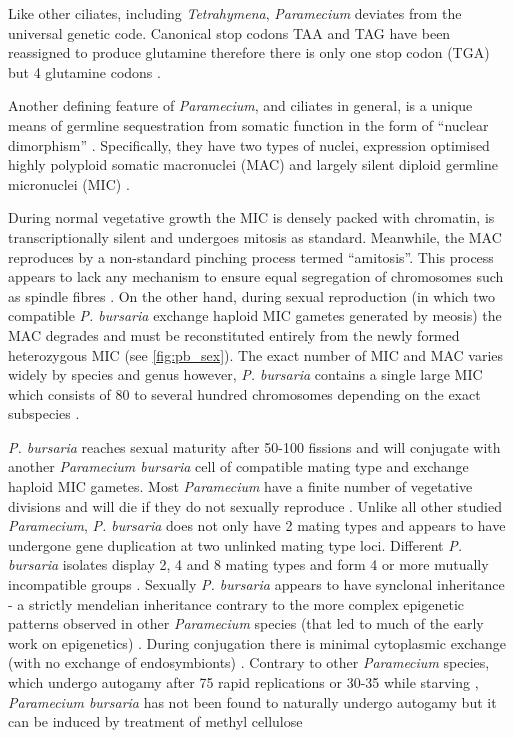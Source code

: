 Like other ciliates, including \textit{Tetrahymena}, \textit{Paramecium} deviates from the universal genetic code.
Canonical stop codons TAA and TAG have been reassigned to produce glutamine therefore there is only one stop codon (TGA) but 4 glutamine codons \citep{Salim2008}.  

Another defining feature of \textit{Paramecium}, and ciliates in general, is a unique means of germline sequestration from somatic function 
in the form of ``nuclear dimorphism'' \citep{Jahn2002}.
Specifically, they have two types of nuclei, expression optimised highly polyploid somatic macronuclei (MAC)
and largely silent diploid germline micronuclei (MIC) \citep{Prescott1994}. 

During normal vegetative growth the MIC is densely packed with chromatin, is transcriptionally silent and undergoes
mitosis as standard.  Meanwhile, the MAC reproduces by a non-standard pinching process termed ``amitosis''.  This process
appears to lack any mechanism to ensure equal segregation of chromosomes such as spindle fibres \citep{Kiefer2013}.
On the other hand, during sexual reproduction (in which two compatible \textit{P. bursaria} exchange haploid MIC gametes generated by meosis) the MAC 
degrades and must be reconstituted entirely from the newly formed heterozygous MIC \citep{Jahn2002} (see \ref{fig:pb_sex}).
The exact number of MIC and MAC varies widely by species and genus however, \textit{P. bursaria}
contains a single large MIC which consists of 80 to several hundred chromosomes depending on the exact subspecies \citep{Chen1940}.  

\textit{P. bursaria} reaches sexual maturity after 50-100 fissions \citep{Siegel1960} and will conjugate with another \textit{Paramecium bursaria}
cell of compatible mating type and exchange haploid MIC gametes. Most \textit{Paramecium} have a finite number of vegetative divisions and 
will die if they do not sexually reproduce \citep{Kiefer2013}. Unlike all other studied \textit{Paramecium}, 
\textit{P. bursaria} does not only have 2 mating types and appears to have undergone gene duplication at two unlinked mating type loci.  
Different \textit{P. bursaria} isolates display 2, 4 and 8 mating types \citep{Phadke2009} and form 4 or more mutually 
incompatible groups \citep{Jennings1939}. 
Sexually \textit{P. bursaria} appears to have synclonal inheritance - a strictly mendelian inheritance contrary to the more 
complex epigenetic patterns observed in other \textit{Paramecium} species (that led to much of the early work on epigenetics) \citep{Siegel1960,Phadke2009}.
During conjugation there is minimal cytoplasmic exchange (with no exchange of endosymbionts) \citep{Wichterman1946}. %
Contrary to other \textit{Paramecium} species, which undergo autogamy after 75 rapid replications \citep{Sung2012} or 30-35 while starving
\citep{Berger1986}, \textit{Paramecium bursaria} has not been found to naturally undergo autogamy \citep{Siegel1963,Yanagi2004} 
but it can be induced by treatment of methyl cellulose \citep{Yanagi2004}

